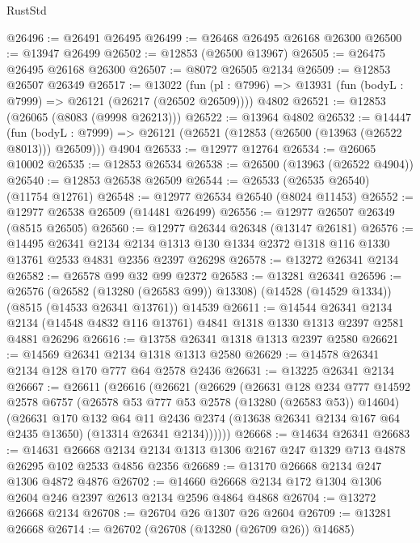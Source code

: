 \begin{lexlean}{RustStd}
\begin{coremodule}
@26496 := @26491 @26495
@26499 := @26468 @26495 @26168 @26300
@26500 := @13947 @26499
@26502 := @12853 (@26500 @13967)
@26505 := @26475 @26495 @26168 @26300
@26507 := @8072 @26505 @2134
@26509 := @12853 @26507 @26349
@26517 := @13022
    (fun (pl : @7996) => @13931 (fun (bodyL : @7999) => @26121 (@26217 (@26502 @26509))))
    @4802
@26521 := @12853 (@26065 (@8083 (@9998 @26213)))
@26522 := @13964 @4802
@26532 := @14447
    (fun (bodyL : @7999) => @26121 (@26521 (@12853 (@26500 (@13963 (@26522 @8013))) @26509)))
    @4904
@26533 := @12977 @12764
@26534 := @26065 @10002
@26535 := @12853 @26534
@26538 := @26500 (@13963 (@26522 @4904))
@26540 := @12853 @26538 @26509
@26544 := @26533 (@26535 @26540) (@11754 @12761)
@26548 := @12977 @26534 @26540 (@8024 @11453)
@26552 := @12977 @26538 @26509 (@14481 @26499)
@26556 := @12977 @26507 @26349 (@8515 @26505)
@26560 := @12977 @26344 @26348 (@13147 @26181)
@26576 := @14495
    @26341
    @2134
    @2134
    @1313
    @130
    @1334
    @2372
    @1318
    @116
    @1330
    @13761
    @2533
    @4831
    @2356
    @2397
    @26298
@26578 := @13272 @26341 @2134
@26582 := @26578 @99 @32 @99 @2372
@26583 := @13281 @26341
@26596 := @26576
    (@26582 (@13280 (@26583 @99)) @13308)
    (@14528 (@14529 @1334))
    (@8515 (@14533 @26341 @13761))
    @14539
@26611 := @14544
    @26341
    @2134
    @2134
    (@14548 @4832 @116 @13761)
    @4841
    @1318
    @1330
    @1313
    @2397
    @2581
    @4881
    @26296
@26616 := @13758 @26341 @1318 @1313 @2397 @2580
@26621 := @14569 @26341 @2134 @1318 @1313 @2580
@26629 := @14578 @26341 @2134 @128 @170 @777 @64 @2578 @2436
@26631 := @13225 @26341 @2134
@26667 := @26611
    (@26616
      (@26621
        (@26629
          (@26631
            @128
            @234
            @777
            @14592
            @2578
            @6757
            (@26578 @53 @777 @53 @2578 (@13280 (@26583 @53)) @14604)
            (@26631
              @170
              @132
              @64
              @11
              @2436
              @2374
              (@13638 @26341 @2134 @167 @64 @2435 @13650)
              (@13314 @26341 @2134))))))
@26668 := @14634 @26341
@26683 := @14631
    @26668
    @2134
    @2134
    @1313
    @1306
    @2167
    @247
    @1329
    @713
    @4878
    @26295
    @102
    @2533
    @4856
    @2356
@26689 := @13170 @26668 @2134 @247 @1306 @4872 @4876
@26702 := @14660 @26668 @2134 @172 @1304 @1306 @2604 @246 @2397 @2613 @2134 @2596 @4864 @4868
@26704 := @13272 @26668 @2134
@26708 := @26704 @26 @1307 @26 @2604
@26709 := @13281 @26668
@26714 := @26702 (@26708 (@13280 (@26709 @26)) @14685)

\end{coremodule}
\end{lexlean}
